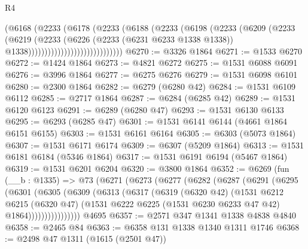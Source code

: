 \begin{lexlean}{R4}
\begin{coremodule}
                                    (@6168
                                      (@2233
                                        (@6178
                                          (@2233
                                            (@6188
                                              (@2233
                                                (@6198
                                                  (@2233
                                                    (@6209
                                                      (@2233
                                                        (@6219
                                                          (@2233
                                                            (@6226
                                                              (@2233 (@6231 @6233 @1338 @1338))
                                                              @1338)))))))))))))))))))))))))))))
@6270 := @3326 @1864
@6271 := @1533 @6270
@6272 := @1424 @1864
@6273 := @4821 @6272
@6275 := @1531 @6088 @6091
@6276 := @3996 @1864
@6277 := @6275 @6276
@6279 := @1531 @6098 @6101
@6280 := @2300 @1864
@6282 := @6279 (@6280 @42)
@6284 := @1531 @6109 @6112
@6285 := @2717 @1864
@6287 := @6284 (@6285 @42)
@6289 := @1531 @6120 @6123
@6291 := @6289 (@6280 @47)
@6293 := @1531 @6130 @6133
@6295 := @6293 (@6285 @47)
@6301 := @1531 @6141 @6144 (@4661 @1864 @6151 @6155)
@6303 := @1531 @6161 @6164
@6305 := @6303 (@5073 @1864)
@6307 := @1531 @6171 @6174
@6309 := @6307 (@5209 @1864)
@6313 := @1531 @6181 @6184 (@5346 @1864)
@6317 := @1531 @6191 @6194 (@5467 @1864)
@6319 := @1531 @6201 @6204
@6320 := @3800 @1864
@6352 := @6269
    (fun (__b : @1335) =>
    @73
      (@6271
        (@6273
          (@6277
            (@6282
              (@6287
                (@6291
                  (@6295
                    (@6301
                      (@6305
                        (@6309
                          (@6313
                            (@6317
                              (@6319
                                (@6320 @42)
                                (@1531
                                  @6212
                                  @6215
                                  (@6320 @47)
                                  (@1531
                                    @6222
                                    @6225
                                    (@1531 @6230 @6233 @47 @42)
                                    @1864))))))))))))))))
    @4695
@6357 := @2571 @347 @1341 @1338 @4838 @4840
@6358 := @2465 @84
@6363 := @6358 @131 @1338 @1340 @1311 @1746
@6368 := @2498 @47 @1311 (@1615 (@2501 @47))

\end{coremodule}
\end{lexlean}

